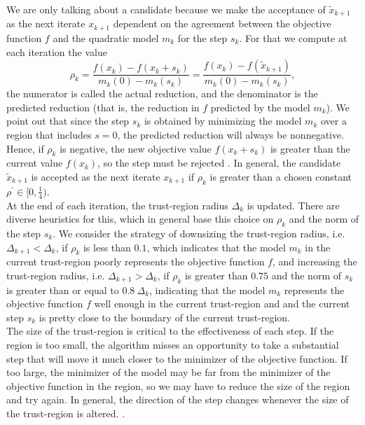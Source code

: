We are only talking about a candidate because we make the acceptance of $\widetilde{x}_{k+1}$ as the next iterate $x_{k+1}$ dependent on the agreement between the objective function $f$ and the quadratic model $m_k$ for the step $s_k$. For that we compute at each iteration the value
\begin{equation}\label{agreement}
    \rho_k = \frac{f(x_k) - f(x_k + s_k)}{m_k(0) - m_k(s_k)} = \frac{f(x_k) - f(\widetilde{x}_{k+1})}{m_k(0) - m_k(s_k)},
\end{equation}
the numerator is called the actual reduction, and the denominator is the predicted reduction (that is, the reduction in $f$ predicted by the model $m_k$). We point out that since the step $s_k$ is obtained by minimizing the model $m_k$ over a region that includes $s = 0$, the predicted reduction will always be nonnegative. Hence, if $\rho_k$ is negative, the new objective value $f(x_k + s_k)$ is greater than the current value $f(x_k)$, so the step must be rejected \cite[p.~68-69]{NocedalWright:2006}. In general, the candidate $\widetilde{x}_{k+1}$ is accepted as the next iterate $x_{k+1}$ if $\rho_k$ is greater than a chosen constant $\rho^{\prime} \in [0 , \frac{1}{4})$. \\
At the end of each iteration, the trust-region radius $\Delta_k$ is updated. There are diverse heuristics for this, which in general base this choice on $\rho_k$ and the norm of the step $s_k$. We consider the strategy of downsizing the trust-region radius, i.e. $\Delta_{k+1} < \Delta_k$, if $\rho_k$ is less than $0.1$, which indicates that the model $m_k$ in the current trust-region poorly represents the objective function $f$, and increasing the trust-region radius, i.e. $\Delta_{k+1} > \Delta_k$, if $\rho_k$ is greater than $0.75$ and the norm of $s_k$ is greater than or equal to $0.8 \ \Delta_k$, indicating that the model $m_k$ represents the objective function $f$ well enough in the current trust-region and and the current step $s_k$ is pretty close to the boundary of the current trust-region. \\
The size of the trust-region is critical to the effectiveness of each step. If the region is too small, the algorithm misses an opportunity to take a substantial step that will move it much closer to the minimizer of the objective function. If too large, the minimizer of the model may be far from the minimizer of the objective function in the region, so we may have to reduce the size of the region and try again. In general, the direction of the step changes whenever the size of the trust-region is altered. \cite[p.~67]{NocedalWright:2006}. \\

